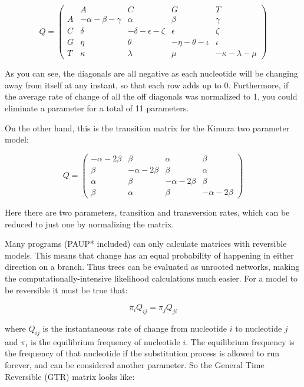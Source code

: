 \documentclass[11pt]{article}
\begin{document}
\[ Q = \left( \begin{array}{ccccc}
  & A & C & G & T \\
A &  - \alpha - \beta - \gamma  &  \alpha  &  \beta  &  \gamma  \\ 
C &  \delta  &  - \delta - \epsilon - \zeta  &  \epsilon  &  \zeta  \\ 
G &  \eta  &  \theta  &  - \eta - \theta - \iota  &  \iota  \\ 
T &  \kappa  &  \lambda  &  \mu  &  - \kappa - \lambda - \mu  
\end{array} \right)\]


As you can see, the diagonals are all negative as each nucleotide will be changing away from itself at any instant, so that each row adds up to 0.  
Furthermore, if the average rate of change of all the off diagonals was normalized to 1, you could eliminate a parameter for a total of 11 parameters.

On the other hand, this is the transition matrix for the Kimura two parameter model:

\[ Q = \left( \begin{array}{cccc}
- \alpha - 2 \beta  &  \beta  &  \alpha  &  \beta  \\ 
\beta  &  - \alpha - 2 \beta  &  \beta  &  \alpha  \\ 
\alpha  &  \beta  &  - \alpha - 2 \beta  &  \beta  \\ 
\beta  &  \alpha  &  \beta  &  - \alpha - 2 \beta   
\end{array} \right)\]


Here there are two parameters, transition and transversion rates, which can be reduced to just one by normalizing the matrix.

Many programs (PAUP* included) can only calculate matrices with reversible models.  This means that change has an equal probability of happening in either direction on a branch.  Thus trees can be evaluated as unrooted networks, making the computationally-intensive likelihood calculations much easier.  For a model to be reversible it must be true that:

\begin{equation*}
\pi_i Q_{ij} = \pi_j Q_{ji}
\end{equation*}

where $Q_{ij}$ is the instantaneous rate of change from nucleotide $i$ to nucleotide $j$
and $\pi_i$ is the equilibrium frequency of nucleotide $i$.
The equilibrium frequency is the frequency of that nucleotide if the substitution process is allowed to run forever, and can be considered another parameter.
So the General Time Reversible (GTR) matrix looks like:
\end{document}
